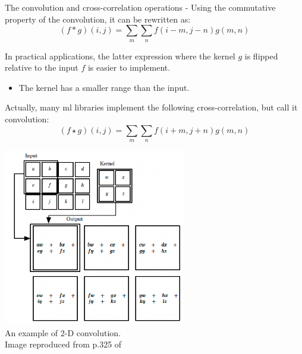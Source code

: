 \begin{frame}[t,allowframebreaks]{The convolution and cross-correlation operations -}
    Using the commutative property of the convolution, it can be rewritten as:
    \begin{equation}
        (f \ast g) (i,j) = 
          \sum_{m} \sum_{n}
          f(i-m,j-n) g(m, n)
        \label{eq:convolution_disc2d_2}
    \end{equation}        

    In practical applications, the latter expression 
    where the kernel $g$ is flipped relative to the input $f$ is easier to implement.
    \begin{itemize}
      \item The kernel has a smaller range than the input.\\
    \end{itemize}
    \vspace{0.2cm}

    Actually, many \gls{ml} libraries implement the following 
    \gls{cross-correlation}, but call it \gls{convolution}:
    \begin{equation}
        (f \star g) (i,j) = 
          \sum_{m} \sum_{n}
          f(i+m,j+n) g(m, n)
        \label{eq:cross_correlation_disc2d_1}
    \end{equation}        

    \framebreak

    \begin{center}
        \includegraphics[width=0.60\textwidth]
        {./images/convolution/goodfellow17_convolution_2d_01.png}\\
     {\scriptsize 
      An example of 2-D convolution.\\
      \color{col:attribution} 
      Image reproduced from p.325 of \cite{Goodfellow:2017MITDL}}\\
    \end{center}

\end{frame}

